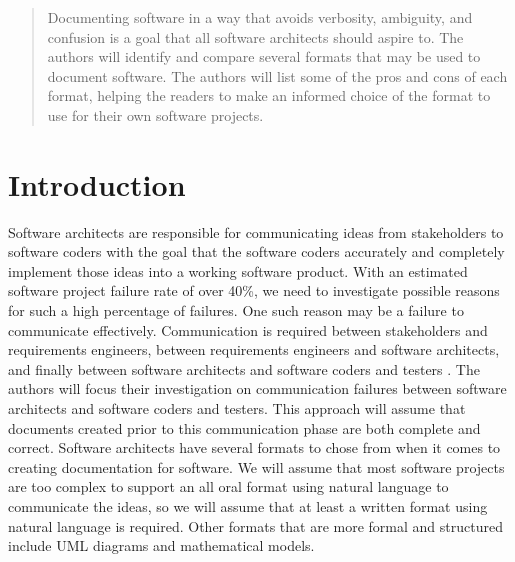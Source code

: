 \documentclass{acm_proc_article-sp}
\begin{document}
\maketitle
\begin{abstract}
Documenting software in a way that avoids verbosity, ambiguity, and confusion is a goal that all software architects should aspire to. The authors will identify and compare several formats that may be used to document software. The authors will list some of the pros and cons of each format, helping the readers to make an informed choice of the format to use for their own software projects.
\end{abstract}





\section{Introduction}
Software architects are responsible for communicating ideas from stakeholders to software coders with the goal that the software coders accurately and completely implement those ideas into a working software product.\newline
With an estimated software project failure rate of over 40\%, we need to investigate possible reasons for such a high percentage of failures. One such reason may be a failure to communicate effectively. Communication is required between stakeholders and requirements engineers, between requirements engineers and software architects, and finally between software architects and software coders and testers \cite{Lamport:RequirementsEngineering}. The authors will focus their investigation on communication failures between software architects and software coders and testers. This approach will assume that documents created prior to this communication phase are both complete and correct.\newline
Software architects have several formats to chose from when it comes to creating documentation for software. We will assume that most software projects are too complex to support an all oral format using natural language to communicate the ideas, so we will assume that at least a written format using natural language is required. Other formats that are more formal and structured include UML diagrams and mathematical models.
\end{document}
